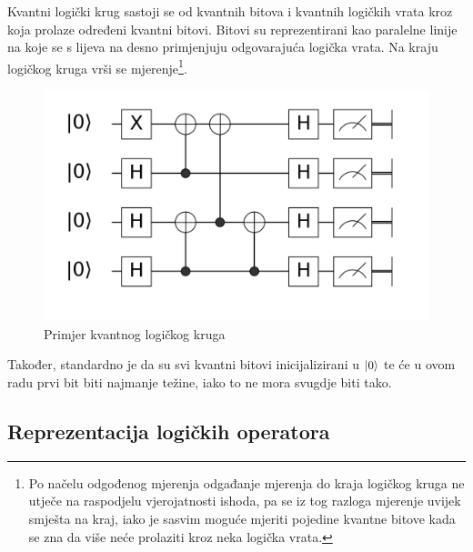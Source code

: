 Kvantni logički krug sastoji se od kvantnih bitova i kvantnih logičkih vrata kroz koja prolaze određeni kvantni bitovi. Bitovi su reprezentirani kao paralelne linije na koje se s lijeva na desno primjenjuju odgovarajuća logička vrata. Na kraju logičkog kruga vrši se mjerenje\footnote{Po načelu odgođenog mjerenja  odgađanje mjerenja do kraja logičkog kruga ne utječe na raspodjelu vjerojatnosti ishoda, pa se iz tog razloga mjerenje uvijek smješta na kraj, iako je sasvim moguće mjeriti pojedine kvantne bitove kada se zna da više neće prolaziti kroz neka logička vrata.}.
\begin{figure}[H]
\centering
\includegraphics[scale=0.2]{img/exampleqc.png}
\caption{Primjer kvantnog logičkog kruga} 
\end{figure}
Također, standardno je da su svi kvantni bitovi inicijalizirani u $\ket{0}$ te će u ovom radu prvi bit biti najmanje težine, iako to ne mora svugdje biti tako.

\subsection{Reprezentacija logičkih operatora}

